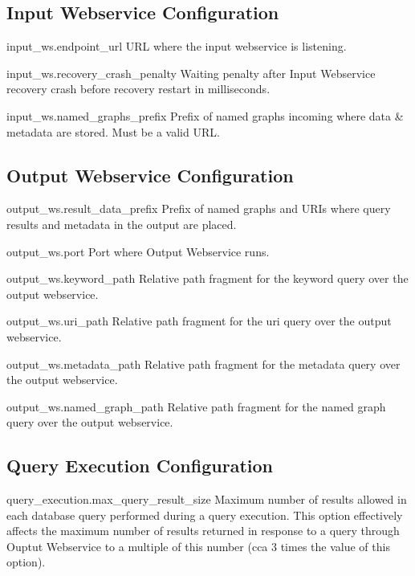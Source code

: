 \subsection*{Input Webservice Configuration}
\begin{configlist}
	\item[input\_ws.endpoint\_url]
		URL where the input webservice is listening.
	\item[input\_ws.recovery\_crash\_penalty]
		Waiting penalty after Input Webservice recovery crash before recovery restart in milliseconds.
	\item[input\_ws.named\_graphs\_prefix]
		Prefix of named graphs incoming where data \& metadata are stored. Must be a valid URL.
\end{configlist}

\subsection*{Output Webservice Configuration}
\begin{configlist}
	\item[output\_ws.result\_data\_prefix]
		Prefix of named graphs and URIs where query results and metadata in the output are placed.
	\item[output\_ws.port]
		Port where Output Webservice runs.
	
	\item[output\_ws.keyword\_path]
		Relative path fragment for the keyword query over the output webservice.
	\item[output\_ws.uri\_path]
		Relative path fragment for the uri query over the output webservice.
	\item[output\_ws.metadata\_path]
		Relative path fragment for the metadata query over the output webservice.
	\item[output\_ws.named\_graph\_path]
		Relative path fragment for the named graph query over the output webservice.
\end{configlist}

\subsection*{Query Execution Configuration}	
\begin{configlist}
	\item[query\_execution.max\_query\_result\_size]
		Maximum number of results allowed in each database query performed during a query execution. This option effectively affects the maximum number of results returned in response to a query through Ouptut Webservice to a multiple of this number (cca 3 times the value of this option).
\end{configlist}

